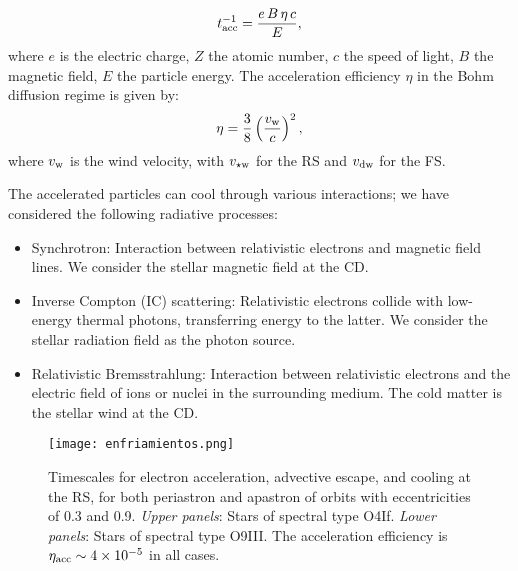 \documentclass[baaa]{baaa}
\begin{document}
\begin{equation}
t_{\rm acc}^{-1} = \dfrac{e\, B\, \eta\, c}{E},
\end{equation}
where $e$ is the electric charge, $Z$ the atomic number, $c$ the speed of light, $B$ the magnetic field, $E$ the particle energy. The acceleration efficiency $\eta$ in the Bohm diffusion regime is given by:
\begin{equation}
\eta = \dfrac{3}{8} \left( \dfrac{v_{\rm w}}{c} \right)^2,
\end{equation}
where $v_{\rm w}$ is the wind velocity, with $v_{\rm \star w}$ for the RS and $v_{\rm dw}$ for the FS.

The accelerated particles can cool through various interactions; we have considered the following radiative processes:
\begin{itemize}
\item Synchrotron: Interaction between relativistic electrons and magnetic field lines. We consider the stellar magnetic field at the CD.
\item Inverse Compton (IC) scattering: Relativistic electrons collide with low-energy thermal photons, transferring energy to the latter. We consider the stellar radiation field as the photon source.
\item Relativistic Bremsstrahlung: Interaction between relativistic electrons and the electric field of ions or nuclei in the surrounding medium. The cold matter is the stellar wind at the CD.
\end{itemize}


\begin{figure*}[h]
\centering
\texttt{[image: enfriamientos.png]} 



\caption{Timescales for electron acceleration, advective escape, and cooling at the RS, for both periastron and apastron of orbits with eccentricities of 0.3 and 0.9. \textit{Upper panels}: Stars of spectral type O4If. \textit{Lower panels}: Stars of spectral type O9III. The acceleration efficiency is $\eta_{\rm acc} \sim 4 \times 10^{-5}$ in all cases.}

    
    \label{fig:timescales}
\end{figure*}
\vspace{-1em}
\end{document}

